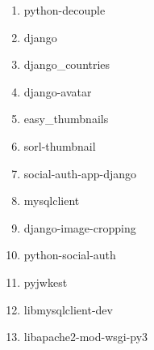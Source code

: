 \begin{enumerate} 

\item python-decouple
\item django
\item django\_countries
\item django-avatar
\item easy\_thumbnails
\item sorl-thumbnail
\item social-auth-app-django
\item mysqlclient
\item django-image-cropping
\item python-social-auth
\item pyjwkest
\item libmysqlclient-dev
\item libapache2-mod-wsgi-py3

\end{enumerate}
